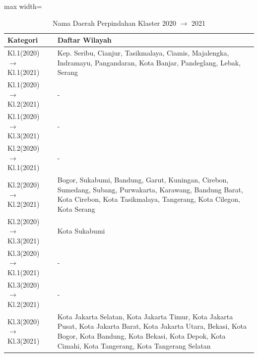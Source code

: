 \begin{table}[H]
\centering
\caption{Nama Daerah Perpindahan Klaster 2020 \(\rightarrow\) 2021} \label{tab:transname2020x2021}
\begin{adjustbox}{max width=\textwidth}
\begin{tabular}{|p{4cm}|p{10cm}|}
\hline
\textbf{Kategori} & \textbf{Daftar Wilayah} \\
\hline
Kl.1(2020) \(\rightarrow\) Kl.1(2021) & Kep. Seribu, Cianjur, Tasikmalaya, Ciamis, Majalengka, Indramayu, Pangandaran, Kota Banjar, Pandeglang, Lebak, Serang \\
\hline
Kl.1(2020) \(\rightarrow\) Kl.2(2021) & - \\
\hline
Kl.1(2020) \(\rightarrow\) Kl.3(2021) & - \\
\hline
Kl.2(2020) \(\rightarrow\) Kl.1(2021) & - \\
\hline
Kl.2(2020) \(\rightarrow\) Kl.2(2021) & Bogor, Sukabumi, Bandung, Garut, Kuningan, Cirebon, Sumedang, Subang, Purwakarta, Karawang, Bandung Barat, Kota Cirebon, Kota Tasikmalaya, Tangerang, Kota Cilegon, Kota Serang \\
\hline
Kl.2(2020) \(\rightarrow\) Kl.3(2021) & Kota Sukabumi \\
\hline
Kl.3(2020) \(\rightarrow\) Kl.1(2021) & - \\
\hline
Kl.3(2020) \(\rightarrow\) Kl.2(2021) & - \\
\hline
Kl.3(2020) \(\rightarrow\) Kl.3(2021) & Kota Jakarta Selatan, Kota Jakarta Timur, Kota Jakarta Pusat, Kota Jakarta Barat, Kota Jakarta Utara, Bekasi, Kota Bogor, Kota Bandung, Kota Bekasi, Kota Depok, Kota Cimahi, Kota Tangerang, Kota Tangerang Selatan \\
\hline
\end{tabular}
\end{adjustbox}
\end{table}
